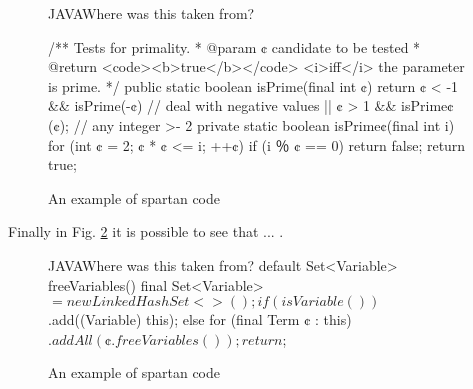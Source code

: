 \begin{figure}[h]
\begin{Code}{JAVA}{Where was this taken from?}
\label{figure:shock-2}
\caption{An example of spartan code}
/** Tests for primality.
  * @param ¢ candidate to be tested
  * @return <code><b>true</b></code> <i>iff</i> the parameter is prime. */
public static boolean isPrime(final int ¢) {
  return ¢ < -1 && isPrime(-¢) // deal with negative values
      || ¢ > 1 && isPrime¢(¢); // any integer >- 2
}
private static boolean isPrime¢(final int i) {
  for (int ¢ = 2; ¢ * ¢ <= i; ++¢)
    if (i ％ ¢ == 0)
      return false;
  return true;
}
\end{Code}
\end{figure}

Finally in Fig. \ref{figure:shock-3} it is possible to see that ... .

\begin{figure}[h]
\label{figure:shock-3}
\caption{An example of spartan code}
\begin{Code}{JAVA}{Where was this taken from?}
default Set<Variable> freeVariables() {
    final Set<Variable> $ = new LinkedHashSet<>();
    if (isVariable())
      $.add((Variable) this);
    else
      for (final Term ¢ : this)
        $.addAll(¢.freeVariables());
    return $;
  }
\end{Code}
\end{figure}


